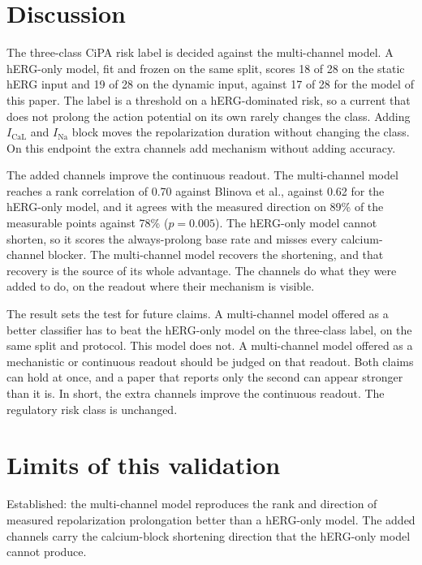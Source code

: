 \documentclass[preprint,12pt]{elsarticle}
\begin{document}
\section{Discussion}\label{sec:discussion}

The three-class CiPA risk label is decided against the multi-channel model. A hERG-only
model, fit and frozen on the same split, scores 18 of 28 on the static hERG input and 19
of 28 on the dynamic input, against 17 of 28 for the model of this paper. The label is a
threshold on a hERG-dominated risk, so a current that does not prolong the action
potential on its own rarely changes the class. Adding $I_{\mathrm{CaL}}$ and
$I_{\mathrm{Na}}$ block moves the repolarization duration without changing the class. On
this endpoint the extra channels add mechanism without adding accuracy.

The added channels improve the continuous readout. The multi-channel model reaches a rank
correlation of 0.70 against Blinova et al., against 0.62 for the hERG-only model, and it
agrees with the measured direction on 89\% of the measurable points against 78\%
($p = 0.005$). The hERG-only model cannot shorten, so it scores the always-prolong base
rate and misses every calcium-channel blocker. The multi-channel model recovers the
shortening, and that recovery is the source of its whole advantage. The channels do what
they were added to do, on the readout where their mechanism is visible.

The result sets the test for future claims. A multi-channel model offered as a better
classifier has to beat the hERG-only model on the three-class label, on the same split
and protocol. This model does not. A multi-channel model offered as a mechanistic or
continuous readout should be judged on that readout. Both claims can hold at once, and a
paper that reports only the second can appear stronger than it is. In short, the extra
channels improve the continuous readout. The regulatory risk class is unchanged.

\section{Limits of this validation}\label{sec:claims}

Established: the multi-channel model reproduces the rank and direction of measured
repolarization prolongation better than a hERG-only model. The added
channels carry the calcium-block shortening direction that the hERG-only model cannot produce.
\end{document}
